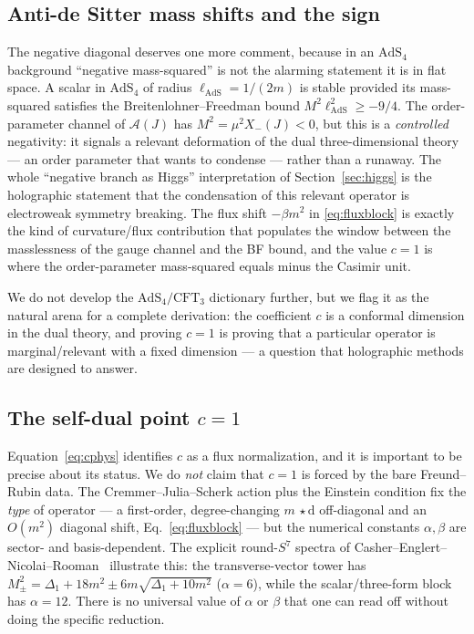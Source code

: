 \documentclass[11pt]{article}
\theoremstyle{plain}
\theoremstyle{definition}
\newcommand{\cA}{\mathcal{A}}
\newcommand{\Xm}{X_{-}}
\newcommand{\dd}{\mathrm{d}}
\newcommand{\AdS}{\mathrm{AdS}}
\begin{document}
\subsection{Anti-de Sitter mass shifts and the sign}
\label{sec:adsshift}

The negative diagonal deserves one more comment, because in an $\AdS_4$
background ``negative mass-squared'' is not the alarming statement it is in
flat space. A scalar in $\AdS_4$ of radius $\ell_{\AdS}=1/(2m)$ is stable
provided its mass-squared satisfies the Breitenlohner--Freedman bound
$M^2\ell_{\AdS}^2\ge-9/4$. The order-parameter channel of $\cA(J)$ has
$M^2=\mu^2\Xm(J)<0$, but this is a \emph{controlled} negativity: it signals
a relevant deformation of the dual three-dimensional theory --- an
order parameter that wants to condense --- rather than a runaway. The whole
``negative branch as Higgs'' interpretation of Section~\ref{sec:higgs} is
the holographic statement that the condensation of this relevant operator is
electroweak symmetry breaking. The flux shift $-\beta m^2$ in
\eqref{eq:fluxblock} is exactly the kind of curvature/flux contribution that
populates the window between the masslessness of the gauge channel and the
BF bound, and the value $c=1$ is where the order-parameter mass-squared
equals minus the Casimir unit.

We do not develop the $\AdS_4/\mathrm{CFT}_3$ dictionary further, but we
flag it as the natural arena for a complete derivation: the coefficient $c$
is a conformal dimension in the dual theory, and proving $c=1$ is proving
that a particular operator is marginal/relevant with a fixed dimension --- a
question that holographic methods are designed to answer.

\subsection{The self-dual point $c=1$}

Equation~\eqref{eq:cphys} identifies $c$ as a flux normalization, and it is
important to be precise about its status. We do \emph{not} claim that $c=1$ is
forced by the bare Freund--Rubin data. The Cremmer--Julia--Scherk action plus
the Einstein condition fix the \emph{type} of operator --- a first-order,
degree-changing $m\,\star\dd$ off-diagonal and an $O(m^2)$ diagonal shift,
Eq.~\eqref{eq:fluxblock} --- but the numerical constants $\alpha,\beta$ are
sector- and basis-dependent. The explicit round-$S^7$ spectra of
Casher--Englert--Nicolai--Rooman~\cite{CasherEnglertNicolaiRooman1984}
illustrate this: the transverse-vector tower has
$M^2_\pm=\Delta_1+18m^2\pm6m\sqrt{\Delta_1+10m^2}$ ($\alpha=6$), while the
scalar/three-form block has $\alpha=12$. There is no universal value of
$\alpha$ or $\beta$ that one can read off without doing the specific
reduction.
\end{document}
